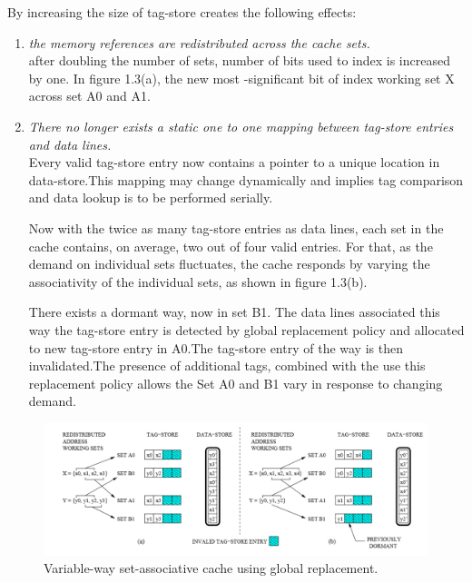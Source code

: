 \documentclass{report}
\begin{document}
\vspace{3cm}
By increasing the size of tag-store creates the following effects:
\begin{enumerate}

\item  \emph{the memory references are redistributed across the cache sets.}\\
after doubling the number of sets, number of bits used to index is increased by one. In figure 1.3(a), the new most -significant bit of index working set X across set A0 and A1.

\item \emph{There no longer exists a static one to one mapping between tag-store entries and data lines.}\\Every valid tag-store entry now contains a pointer to a unique location in data-store.This mapping may change dynamically and implies tag comparison and data lookup is to be performed serially.

\vspace{.8cm}
Now with the twice as many tag-store entries as data lines, each set in the cache contains, on average, two out of four valid entries. For that, as the demand on individual sets fluctuates, the cache responds by varying the associativity of the individual sets, as shown in figure 1.3(b).

\vspace{.8cm}
There exists a dormant way, now in set B1.  The data lines associated this way the tag-store entry is detected by global replacement policy and allocated to new tag-store entry in A0.The tag-store entry of the way is then invalidated.The presence of additional tags, combined with the use this replacement policy allows the Set A0 and B1 vary in response to changing demand.


\end {enumerate}
\begin{figure}[t]
\includegraphics[width=1\textwidth]{./fig3}
\caption{ Variable-way set-associative cache using global replacement.}

\label{fig3}
\end{figure}
\end{document}
